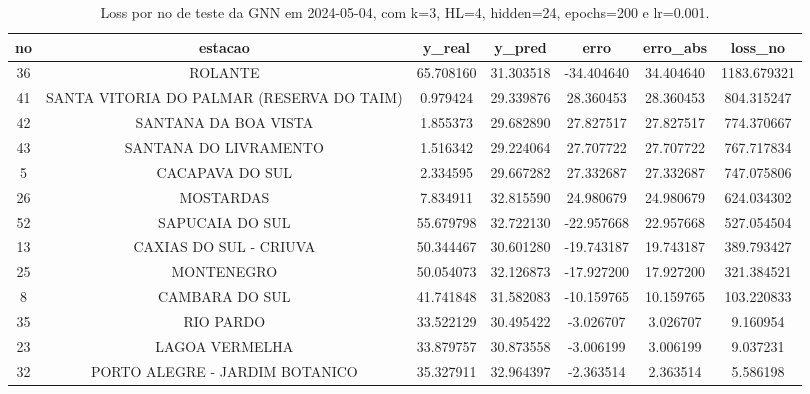 \begin{table}[h]
\centering
\caption{Loss por no de teste da GNN em 2024-05-04, com k=3, HL=4, hidden=24, epochs=200 e lr=0.001.}
\label{tab:gnn_loss_k3_hl4_h24_e200_d20240504}
\begin{tabular}{ccccccc}
\toprule
no & estacao & y\_real & y\_pred & erro & erro\_abs & loss\_no \\
\midrule
36 & ROLANTE & 65.708160 & 31.303518 & -34.404640 & 34.404640 & 1183.679321 \\
41 & SANTA VITORIA DO PALMAR (RESERVA DO TAIM) & 0.979424 & 29.339876 & 28.360453 & 28.360453 & 804.315247 \\
42 & SANTANA DA BOA VISTA & 1.855373 & 29.682890 & 27.827517 & 27.827517 & 774.370667 \\
43 & SANTANA DO LIVRAMENTO & 1.516342 & 29.224064 & 27.707722 & 27.707722 & 767.717834 \\
5 & CACAPAVA DO SUL & 2.334595 & 29.667282 & 27.332687 & 27.332687 & 747.075806 \\
26 & MOSTARDAS & 7.834911 & 32.815590 & 24.980679 & 24.980679 & 624.034302 \\
52 & SAPUCAIA DO SUL & 55.679798 & 32.722130 & -22.957668 & 22.957668 & 527.054504 \\
13 & CAXIAS DO SUL - CRIUVA & 50.344467 & 30.601280 & -19.743187 & 19.743187 & 389.793427 \\
25 & MONTENEGRO & 50.054073 & 32.126873 & -17.927200 & 17.927200 & 321.384521 \\
8 & CAMBARA DO SUL & 41.741848 & 31.582083 & -10.159765 & 10.159765 & 103.220833 \\
35 & RIO PARDO & 33.522129 & 30.495422 & -3.026707 & 3.026707 & 9.160954 \\
23 & LAGOA VERMELHA & 33.879757 & 30.873558 & -3.006199 & 3.006199 & 9.037231 \\
32 & PORTO ALEGRE - JARDIM BOTANICO & 35.327911 & 32.964397 & -2.363514 & 2.363514 & 5.586198 \\
\bottomrule
\end{tabular}
\end{table}
